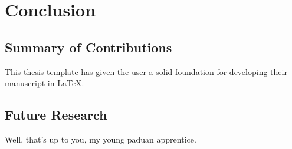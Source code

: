 \chapter{Conclusion}\label{chapter:conclusion}

\section{Summary of Contributions}\label{summary-of-contributions}

This thesis template has given the user a solid foundation for
developing their manuscript in \LaTeX.

\section{Future Research}\label{future-research}

Well, that's up to you, my young paduan apprentice.
